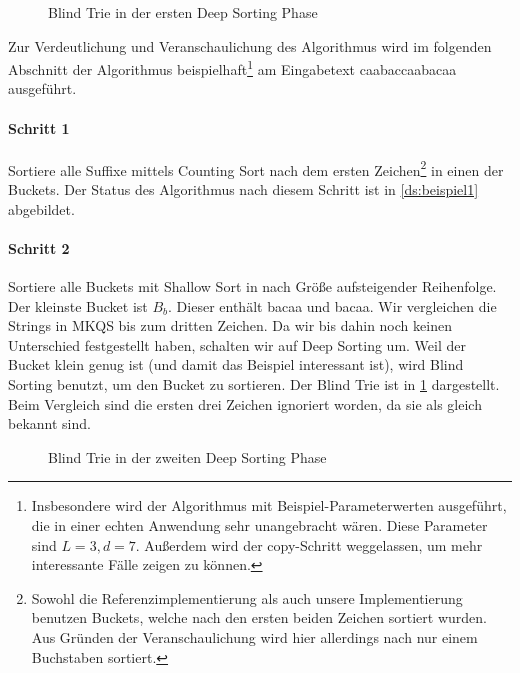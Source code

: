 \newcommand{\tnode}{\node[draw,circle]}
\newcommand{\trans}{\draw[-stealth]}
\begin{figure}[!h]
\centering
{}
\caption{Blind Trie in der ersten Deep Sorting Phase}
\label{ds:beispiel_bt1}
\end{figure}

Zur Verdeutlichung und Veranschaulichung des Algorithmus wird im folgenden Abschnitt der Algorithmus
beispielhaft\footnote{Insbesondere wird der Algorithmus mit Beispiel-Parameterwerten ausgeführt,
die in einer echten Anwendung sehr unangebracht wären. Diese Parameter sind $L = 3, d = 7$. Außerdem wird der copy-Schritt weggelassen, um mehr interessante Fälle zeigen zu können.}
am Eingabetext \glqq caabaccaabacaa\grqq{} ausgeführt.

\paragraph{Schritt 1} Sortiere alle Suffixe mittels Counting Sort nach dem ersten Zeichen\footnote{Sowohl die Referenzimplementierung als auch unsere Implementierung benutzen Buckets, welche nach den ersten beiden Zeichen sortiert wurden.
Aus Gründen der Veranschaulichung wird hier allerdings nach nur einem Buchstaben sortiert.} in einen der Buckets.
Der Status des Algorithmus nach diesem Schritt ist in \cref{ds:beispiel1} abgebildet.

\paragraph{Schritt 2} Sortiere alle Buckets mit Shallow Sort in nach Größe aufsteigender Reihenfolge.
Der kleinste Bucket ist $B_b$.
Dieser enthält \glqq bacaa\grqq{} und \glqq bacaa\grqq.
Wir vergleichen die Strings in MKQS bis zum dritten Zeichen.
Da wir bis dahin noch keinen Unterschied festgestellt haben, schalten wir auf Deep Sorting um. 
Weil der Bucket klein genug ist (und damit das Beispiel interessant ist), wird Blind Sorting benutzt, um den Bucket zu sortieren.
Der Blind Trie ist in \cref{ds:beispiel_bt1} dargestellt.
Beim Vergleich sind die ersten drei Zeichen ignoriert worden, da sie als gleich bekannt sind.

\begin{figure}
\centering
{}
\caption{Blind Trie in der zweiten Deep Sorting Phase}
\label{ds:beispiel_bt2}
\end{figure}

